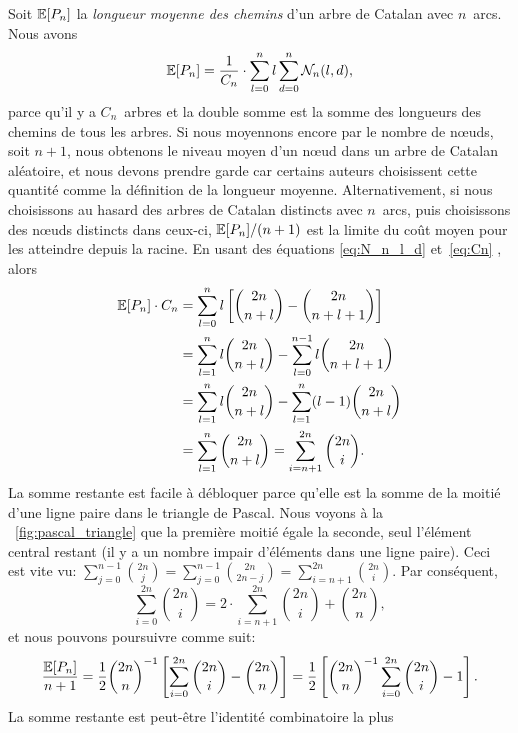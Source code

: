 Soit \(\mathbb{E}[{P_n}]\) la \emph{longueur moyenne des chemins} d'un
arbre de Catalan avec \(n\)~arcs. Nous avons
\begin{equation*}
  \mathbb{E}[{P_n}] = \frac{1}{C_{n}} \cdot \sum_{l=0}^{n}l\sum_{d=0}^{n}\mathcal{N}_n(l,d),
\end{equation*}
parce qu'il y a \(C_n\)~arbres et la double somme est la somme des
longueurs des chemins de tous les arbres. Si nous moyennons encore par
le nombre de n{\oe}uds, soit \(n+1\), nous obtenons le niveau moyen
d'un n{\oe}ud dans un arbre de Catalan aléatoire, et nous devons
prendre garde car certains auteurs choisissent cette quantité comme la
définition de la longueur moyenne. Alternativement, si nous
choisissons au hasard des arbres de Catalan distincts avec \(n\)~arcs,
puis choisissons des n{\oe}uds distincts dans ceux-ci,
\(\mathbb{E}[{P_n}]/(n+1)\) est la limite du coût moyen pour les
atteindre depuis la racine. En usant des équations \eqref{eq:N_n_l_d}
et~\eqref{eq:Cn} , alors
\begin{align*}
\mathbb{E}[{P_n}] \cdot C_n
 &= \sum_{l=0}^{n}l\left[\binom{2n}{n+l} - \binom{2n}{n+l+1}\right]\\
 &= \sum_{l=1}^{n}l \binom{2n}{n+l} - \sum_{l=0}^{n-1}l \binom{2n}{n+l+1}\\
 &= \sum_{l=1}^{n}l \binom{2n}{n+l} - \sum_{l=1}^{n}(l-1)\binom{2n}{n+l}\\
 &= \sum_{l=1}^{n}\binom{2n}{n+l}
  = \sum_{i=n+1}^{2n}\binom{2n}{i}.
\end{align*}
La somme restante est facile à débloquer parce qu'elle est la somme de
la moitié d'une ligne paire dans le triangle de Pascal. Nous voyons à
la \fig~\vref{fig:pascal_triangle} que la première moitié égale la
seconde, seul l'élément central restant (il y a un nombre impair
d'éléments dans une ligne paire). Ceci est vite vu:
\(\sum_{j=0}^{n-1}\binom{2n}{j} = \sum_{j=0}^{n-1}\binom{2n}{2n-j} =
\sum_{i=n+1}^{2n}\binom{2n}{i}\). Par conséquent,
\begin{equation*}
\sum_{i=0}^{2n}\binom{2n}{i} = 2 \cdot \!\! \sum_{i=n+1}^{2n}\binom{2n}{i}
+ \binom{2n}{n},
\end{equation*}
et nous pouvons poursuivre comme suit:
\begin{equation*}
\frac{\mathbb{E}[{P_n}]}{n+1}
  = \frac{1}{2}\binom{2n}{n}^{-1}\left[\sum_{i=0}^{2n}\binom{2n}{i} -
    \binom{2n}{n}\right]
  = \frac{1}{2}\left[\binom{2n}{n}^{-1}\sum_{i=0}^{2n}\binom{2n}{i} - 1\right].
\end{equation*}
La somme restante est peut-être l'identité combinatoire la plus

